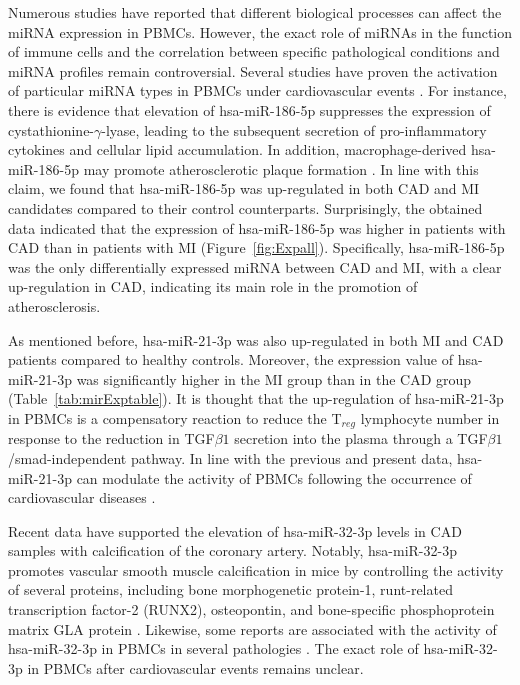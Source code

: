\documentclass[sn-mathphys,Numbered]{sn-jnl}%
\theoremstyle{thmstyleone}%
\theoremstyle{thmstyletwo}%
\theoremstyle{thmstylethree}%
\begin{document}
Numerous studies have reported that different biological processes can
affect the miRNA expression in PBMCs. However, the exact role of miRNAs
in the function of immune cells and the correlation between specific
pathological conditions and miRNA profiles remain controversial. Several
studies have proven the activation of particular miRNA types in PBMCs
under cardiovascular events \cite{296}. For instance, there is
evidence that elevation of hsa-miR-186-5p suppresses the expression of
cystathionine-$\gamma$-lyase, leading to the subsequent secretion of
pro-inflammatory cytokines and cellular lipid accumulation. In addition,
macrophage-derived hsa-miR-186-5p may promote atherosclerotic plaque formation
\cite{186}. In line with this claim, we found that hsa-miR-186-5p was
up-regulated in both CAD and MI candidates compared to their control
counterparts. Surprisingly, the obtained data indicated that the
expression of hsa-miR-186-5p was higher in patients with CAD than in patients
with MI (Figure~\ref{fig:Expall}). Specifically, hsa-miR-186-5p was the only
differentially expressed miRNA between CAD and MI, with a clear
up-regulation in CAD, indicating its main role in the promotion of
atherosclerosis.

As mentioned before, hsa-miR-21-3p was also up-regulated in both MI and CAD
patients compared to healthy controls. Moreover, the expression value of
hsa-miR-21-3p was significantly higher in the MI group than in the CAD group
(Table~\ref{tab:mirExptable}). It is thought that the up-regulation of
hsa-miR-21-3p in PBMCs is a compensatory reaction to reduce the T$_{reg}$
lymphocyte number in response to the reduction in TGF$\beta1$
secretion into the plasma through a TGF$\beta1$/smad-independent
pathway. In line with the previous and present data, hsa-miR-21-3p can modulate
the activity of PBMCs following the occurrence of cardiovascular
diseases \cite{21}.

Recent data have supported the elevation of hsa-miR-32-3p levels in CAD samples
with calcification of the coronary artery. Notably, hsa-miR-32-3p promotes
vascular smooth muscle calcification in mice by controlling the activity
of several proteins, including bone morphogenetic protein-1,
runt-related transcription factor-2 (RUNX2), osteopontin, and
bone-specific phosphoprotein matrix GLA protein \cite{32-2}.
Likewise, some reports are associated with the activity of hsa-miR-32-3p in
PBMCs in several pathologies \cite{magic, 32}. The
exact role of hsa-miR-32-3p in PBMCs after cardiovascular events remains
unclear.
\end{document}
